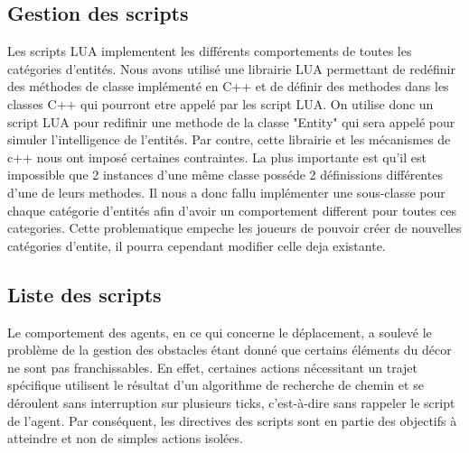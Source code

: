 \documentclass[a4paper]{article}
\newcommand{\alinea}{\hspace*{0.5cm}}
\begin{document}
		\subsection{Gestion des scripts}
			Les scripts LUA implementent les différents comportements de toutes les catégories d'entités. Nous avons utilisé une librairie LUA permettant de redéfinir des méthodes de classe implémenté en C++ et de définir des methodes dans les classes C++ qui pourront etre appelé par les script LUA.
			On utilise donc un script LUA pour redifinir une methode de la classe "Entity" qui sera appelé pour simuler l'intelligence de l'entités.
			Par contre, cette librairie et les mécanismes de c++ nous ont imposé certaines contraintes. La plus importante est qu'il est impossible que 2 instances d'une même classe posséde 2 définissions différentes d'une de leurs methodes. Il nous a donc fallu implémenter une sous-classe pour chaque catégorie d'entités afin d'avoir un comportement different pour toutes ces categories. Cette problematique empeche les joueurs de pouvoir créer de nouvelles catégories d'entite, il pourra cependant modifier celle deja existante.
			
			
		\subsection{Liste des scripts}
		
			\alinea Le comportement des agents, en ce qui concerne le déplacement, a soulevé le problème de la gestion des obstacles étant donné que certains éléments du décor ne sont pas franchissables.
En effet, certaines actions nécessitant un trajet spécifique utilisent le résultat d'un algorithme de recherche de chemin et se déroulent sans interruption sur plusieurs ticks, c'est-à-dire sans rappeler le script de l'agent.
Par conséquent, les directives des scripts sont en partie des objectifs à atteindre et non de simples actions isolées.
   
\end{document}

